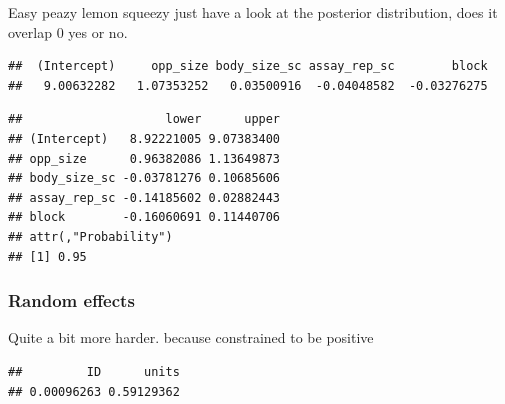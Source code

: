 \documentclass[
  12pt,
]{book}
\newenvironment{Shaded}{\begin{snugshade}}{\end{snugshade}}
\newcommand{\KeywordTok}[1]{\textcolor[rgb]{0.13,0.29,0.53}{\textbf{#1}}}
\newcommand{\NormalTok}[1]{#1}
\newcommand{\OperatorTok}[1]{\textcolor[rgb]{0.81,0.36,0.00}{\textbf{#1}}}
\begin{document}
Easy peazy lemon squeezy just have a look at the posterior distribution, does it overlap 0 yes or no.

\begin{Shaded}
\end{Shaded}

\begin{verbatim}
##  (Intercept)     opp_size body_size_sc assay_rep_sc        block 
##   9.00632282   1.07353252   0.03500916  -0.04048582  -0.03276275
\end{verbatim}

\begin{Shaded}
\end{Shaded}

\begin{verbatim}
##                    lower      upper
## (Intercept)   8.92221005 9.07383400
## opp_size      0.96382086 1.13649873
## body_size_sc -0.03781276 0.10685606
## assay_rep_sc -0.14185602 0.02882443
## block        -0.16060691 0.11440706
## attr(,"Probability")
## [1] 0.95
\end{verbatim}

\hypertarget{random-effects-2}{%
\subsubsection{Random effects}\label{random-effects-2}}

Quite a bit more harder. because constrained to be positive

\begin{Shaded}
\end{Shaded}

\begin{verbatim}
##         ID      units 
## 0.00096263 0.59129362
\end{verbatim}

\begin{Shaded}
\end{Shaded}
\end{document}
